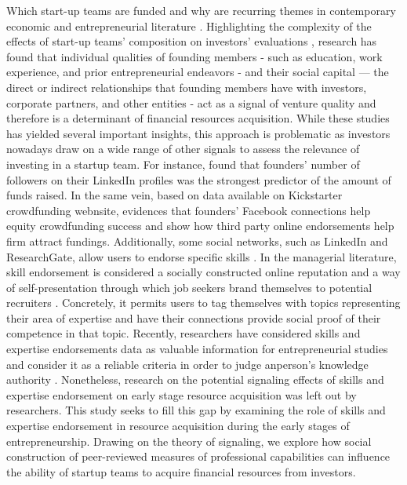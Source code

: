\documentclass[12pt]{article}
\begin{document}
Which start-up teams are funded and why are recurring themes in contemporary economic and entrepreneurial literature \citep{baum2004picking, beckman2007early, bernstein2017attracting, franke2006you, franke2008venture, kaplan2009should, plummer2016better, shane2002network}. Highlighting the complexity of the effects of start-up teams' composition on investors’ evaluations \citep{ghassemiautomated}, research has found that individual qualities of founding members - such as education, work experience, and prior entrepreneurial endeavors \citep{shane2002network, hsu2007experienced} - and their social capital — the direct or indirect relationships that founding members have with investors, corporate partners, and other entities \citep{shane2002network, hsu2007experienced, huang2017resources} - act as a signal of venture quality and therefore is a determinant of financial resources acquisition. While these studies has yielded several important insights, this approach is problematic as investors nowadays draw on a wide range of other signals to assess the relevance of investing in a startup team. For instance, \citet{banerji2019startup} found that founders' number of followers on their LinkedIn profiles was the strongest predictor of the amount of funds raised. In the same vein, based on data available on Kickstarter crowdfunding webnsite, \citet{mollick2014dynamics} evidences that founders' Facebook connections help equity crowdfunding success and \citet{courtney2017resolving} show how third party online endorsements help firm attract fundings. Additionally, some social networks, such as LinkedIn and ResearchGate, allow users to endorse specific skills \citep{perez2016endorsement, wu2018analysis}. In the managerial literature, skill endorsement is considered a socially constructed online reputation and a way of self-presentation through which job seekers brand themselves to potential recruiters \citep{rapanta2017linkedin}. Concretely, it permits users to tag themselves with topics representing their area of expertise and have their connections provide social proof of their competence in that topic. Recently, researchers have considered skills and expertise endorsements data as valuable information for entrepreneurial studies and consider it as a reliable criteria in order to judge anperson’s knowledge authority \citep{reese2020should, sako2020scaling}. Nonetheless, research on the potential signaling effects of skills and expertise endorsement on early stage resource acquisition was left out by researchers. This study seeks to fill this gap by examining the role of skills and expertise endorsement in resource acquisition during the early stages of entrepreneurship. Drawing on the theory of signaling, we explore how social construction of peer-reviewed measures of professional capabilities can influence the ability of startup teams to acquire financial resources from investors.
\end{document}
